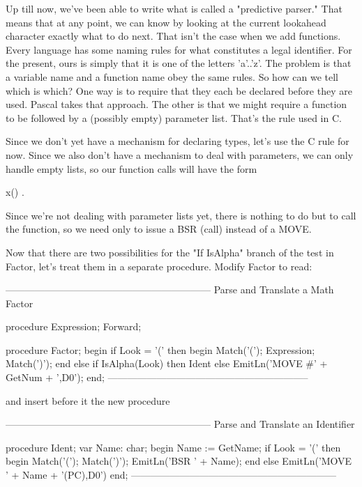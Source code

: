 \documentclass[float=false, crop=false]{standalone}
\begin{document}
Up till now, we've been able to write what is called a "predictive parser." That
means that at any point, we can know by looking at the current lookahead
character exactly what to do next. That isn't the case when we add functions.
Every language has some naming rules for what constitutes a legal identifier.
For the present, ours is simply that it is one of the letters 'a'..'z'. The
problem is that a variable name and a function name obey the same rules. So how
can we tell which is which? One way is to require that they each be declared
before they are used. Pascal takes that approach. The other is that we might
require a function to be followed by a (possibly empty) parameter list. That's
the rule used in C.

Since we don't yet have a mechanism for declaring types, let's use the C rule
for now. Since we also don't have a mechanism to deal with parameters, we can
only handle empty lists, so our function calls will have the form

                    x()  .

Since we're not dealing with parameter lists yet, there is nothing to do but to
call the function, so we need only to issue a BSR (call) instead of a MOVE.

Now that there are two possibilities for the "If IsAlpha" branch of the test in
Factor, let's treat them in a separate procedure. Modify Factor to read:

\begin{code}
{---------------------------------------------------------------}
{ Parse and Translate a Math Factor }

procedure Expression; Forward;

procedure Factor;
begin
   if Look = '(' then begin
      Match('(');
      Expression;
      Match(')');
      end
   else if IsAlpha(Look) then
      Ident
   else
      EmitLn('MOVE #' + GetNum + ',D0');
end;
{--------------------------------------------------------------}
\end{code}

and insert before it the new procedure

\begin{code}
{---------------------------------------------------------------}
{ Parse and Translate an Identifier }

procedure Ident;
var Name: char;
begin
   Name := GetName;
   if Look = '(' then begin
      Match('(');
      Match(')');
      EmitLn('BSR ' + Name);
      end
   else
      EmitLn('MOVE ' + Name + '(PC),D0')
end;
{---------------------------------------------------------------}
\end{code}
\end{document}
